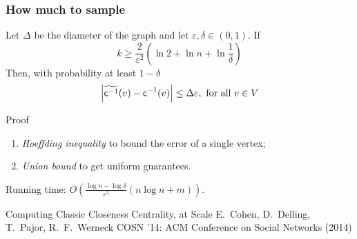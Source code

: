 
\begin{frame}
  \frametitle{How much to sample}
  \begin{lemma}
    Let $\Delta$ be the diameter of the graph and let
    $\varepsilon,\delta\in(0,1)$. If
    \[
      k\ge\frac{2}{\varepsilon^2} \left(\ln 2 + \ln n +
      \ln\frac{1}{\delta}\right)
    \]
    Then, with probability at least $1-\delta$
    \[
      \left|\widetilde{\mathsf{c}^{-1}}(v)-\mathsf{c}^{-1}(v)\right| \le
      \Delta\varepsilon, \text{ for all } v\in V
    \]
  \end{lemma}
  \pause
  \begin{block}{Proof}
    \begin{enumerate}
      \item \emph{Hoeffding inequality} to bound the error of a single vertex;
      \item \emph{Union bound} to get uniform guarantees.
    \end{enumerate}
  \end{block}
  \pause
  Running time: $O\left(\frac{\log n - \log \delta}{\varepsilon^2}(n\log n +
  m)\right)$.
\end{frame}

\begin{frame}
  \centering
  \vfill
  {\huge Computing Classic Closeness Centrality, at Scale}
  \vfill
  {\Large E.~Cohen, D.~Delling, T.~Pajor, R.~F.~Werneck}
  \vfill
  {\large COSN '14: ACM Conference on Social Networks (2014) }
  \vfill
\end{frame}

